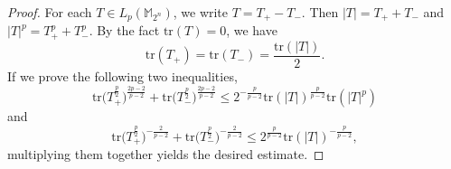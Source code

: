 \documentclass{amsbook}
\theoremstyle{definition}
\theoremstyle{remark}
\numberwithin{section}{chapter}
\numberwithin{equation}{chapter}
\newcommand{\1}{\mathbf{1}}
\begin{document}
\begin{proof}


For each $T\in L_p(\mathbb M_{2^n})$,  we write $T=T_+-T_-$. Then $|T|=T_++T_{-}$ and $|T|^p=T_+^p+T_{-}^p$. By the fact $\mathrm{tr}(T)=0$, we have
\begin{equation}\label{t-tr}
\mathrm{tr}(T_+)=\mathrm{tr}(T_{-})=\frac{\mathrm{tr}(|T|)}{2}.
\end{equation}
If we prove the following two inequalities,
\begin{equation}\label{t-1}
\mathrm{tr}\big(T_+^{\frac{p}{2}}\big)^{\frac{2p-2}{p-2}} + \mathrm{tr}\big(T_-^{\frac{p}{2}}\big)^{\frac{2p-2}{p-2}} \leq 2^{-\frac{p}{p-2}}\mathrm{tr}(|T|)^{\frac{p}{p-2}}\mathrm{tr}(|T|^p)
\end{equation}
and
\begin{equation}\label{t-2}
\mathrm{tr}\big(T_+^{\frac{p}{2}}\big)^{-\frac{2}{p-2}} + \mathrm{tr}\big(T_-^{\frac{p}{2}}\big)^{-\frac{2}{p-2}}\leq 2^{\frac{p}{p-2}} \mathrm{tr}(|T|)^{-\frac{p}{p-2}},
\end{equation}
multiplying them together yields the desired estimate.
	

\end{proof}
\end{document}
